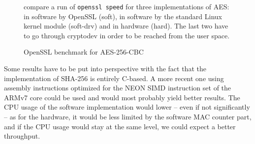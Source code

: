 \begin{figure}[ht]

\caption{OpenSSL benchmark for AES-256-CBC}{compare a run of \texttt{openssl speed} for three implementations of AES: in software by OpenSSL (soft), in software by the standard Linux kernel module (soft-drv) and in hardware (hard). The last two have to go through cryptodev in order to be reached from the user space.}
\label{fig:openssl-speed}
\end{figure}

Some results have to be put into perspective with the fact that the implementation of SHA-256 is entirely C-based.
A more recent one using assembly instructions optimized for the NEON SIMD instruction set of the ARMv7 core could be used and would most probably yield better results.
The CPU usage of the software implementation would lower -- even if not significantly -- as for the hardware, it would be less limited by the software MAC counter part, and if the CPU usage would stay at the same level, we could expect a better throughput.
